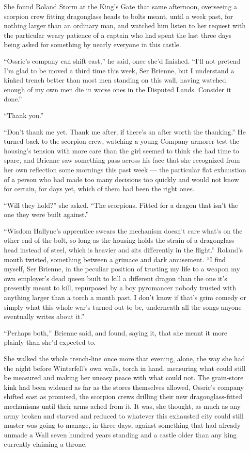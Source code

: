 \sceneBreak

She found Roland Storm at the King’s Gate that same afternoon, overseeing a scorpion crew fitting dragonglass heads to bolts meant, until a week past, for nothing larger than an ordinary man, and watched him listen to her request with the particular weary patience of a captain who had spent the last three days being asked for something by nearly everyone in this castle.

“Ossric’s company can shift east,” he said, once she’d finished. “I’ll not pretend I’m glad to be moved a third time this week, Ser Brienne, but I understand a kinked trench better than most men standing on this wall, having watched enough of my own men die in worse ones in the Disputed Lands. Consider it done.”

“Thank you.”

“Don’t thank me yet. Thank me after, if there’s an after worth the thanking.” He turned back to the scorpion crew, watching a young Company armorer test the housing’s tension with more care than the girl seemed to think she had time to spare, and Brienne saw something pass across his face that she recognized from her own reflection some mornings this past week — the particular flat exhaustion of a person who had made too many decisions too quickly and would not know for certain, for days yet, which of them had been the right ones.

“Will they hold?” she asked. “The scorpions. Fitted for a dragon that isn’t the one they were built against.”

“Wisdom Hallyne’s apprentice swears the mechanism doesn’t care what’s on the other end of the bolt, so long as the housing holds the strain of a dragonglass head instead of steel, which is heavier and sits differently in the flight.” Roland’s mouth twisted, something between a grimace and dark amusement. “I find myself, Ser Brienne, in the peculiar position of trusting my life to a weapon my own employer’s dead queen built to kill a different dragon than the one it’s presently meant to kill, repurposed by a boy pyromancer nobody trusted with anything larger than a torch a month past. I don’t know if that’s grim comedy or simply what this whole war’s turned out to be, underneath all the songs anyone eventually writes about it.”

“Perhaps both,” Brienne said, and found, saying it, that she meant it more plainly than she’d expected to.

\sceneBreak

She walked the whole trench-line once more that evening, alone, the way she had the night before Winterfell’s own walls, torch in hand, measuring what could still be measured and making her uneasy peace with what could not. The grain-store kink had been widened as far as the stores themselves allowed, Ossric’s company shifted east as promised, the scorpion crews drilling their new dragonglass-fitted mechanisms until their arms ached from it. It was, she thought, as much as any army broken and starved and reduced to whatever this exhausted city could still muster was going to manage, in three days, against something that had already unmade a Wall seven hundred years standing and a castle older than any king currently claiming a throne.

